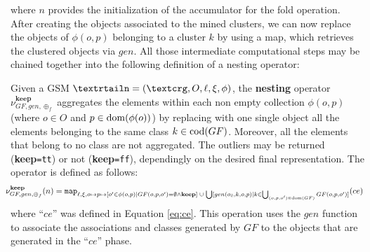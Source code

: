 where $n$ provides the initialization of the accumulator for the fold operation.
After creating the objects associated to the mined clusters, we can now replace the objects of $\phi(o,p)$ belonging to a cluster $k$ by using a map, which retrieves the clustered objects via $gen$. All those intermediate computational steps may be chained together into the following definition of a nesting operator:

\begin{definition}[Nesting]\label{def:semistructnest}
	Given a GSM $\fullnested$, the \textbf{nesting} operator $\nu_{GF,gen,\oplus_f}^{\textbf{keep}}$ aggregates the elements within each non empty collection $\phi(o,p)$ (where $o\in O$ and $p\in\operatorname{dom}(\phi(o))$) by replacing with one single object all the elements belonging to the same class $k\in \operatorname{cod}(GF)$. Moreover, all the elements that belong to no class are not aggregated. The outliers may be returned (\textbf{keep}\texttt{=tt}) or not (\textbf{keep}\texttt{=ff}), dependingly on the desired final representation. The operator is defined as follows:
	\[\hspace{-.25cm}\nu^{\textbf{keep}}_{GF,gen,\oplus_f}(n)=\texttt{map}_{\ell,\xi,o\mapsto p\mapsto [o'\in \phi(o,p)|GF(o,p,o')=\emptyset\wedge \textbf{keep}]\;\cup\;\bigcup[gen(o_{\tilde{c}},k,o,p)|k\in\bigcup_{(o,p,o')\in\dom(GF)} GF(o,p,o')]}(ce)\]
where ``$ce$'' was defined in Equation \vref{eq:ce}. This operation uses the $gen$ function to associate the associations and classes generated by $GF$ to the objects that are generated in the ``$ce$'' phase.
\end{definition}

